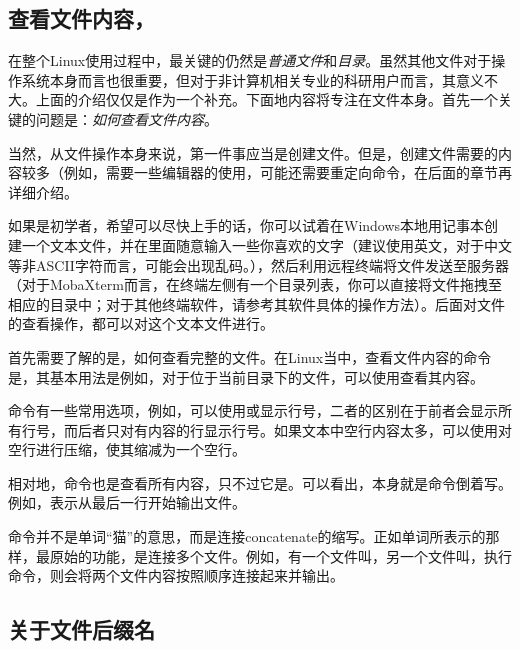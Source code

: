 \subsection{查看文件内容，}\label{subsec:查看文件-查看文件内容}

在整个Linux使用过程中，最关键的仍然是\emph{普通文件}和\emph{目录}。虽然其他文件对于操作系统本身而言也很重要，但对于非计算机相关专业的科研用户而言，其意义不大。上面的介绍仅仅是作为一个补充。下面地内容将专注在文件本身。首先一个关键的问题是：\emph{如何查看文件内容}。

\begin{attention}
    当然，从文件操作本身来说，第一件事应当是创建文件。但是，创建文件需要的内容较多（例如，需要一些编辑器的使用，可能还需要重定向命令，在后面的章节再详细介绍。
    
    如果是初学者，希望可以尽快上手的话，你可以试着在Windows本地用记事本创建一个文本文件，并在里面随意输入一些你喜欢的文字（建议使用英文，对于中文等非ASCII字符而言，可能会出现乱码。），然后利用远程终端将文件发送至服务器（对于MobaXterm而言，在终端左侧有一个目录列表，你可以直接将文件拖拽至相应的目录中；对于其他终端软件，请参考其软件具体的操作方法）。后面对文件的查看操作，都可以对这个文本文件进行。
\end{attention}

首先需要了解的是，如何查看完整的文件。在Linux当中，查看文件内容的命令是，其基本用法是例如，对于位于当前目录下的文件，可以使用查看其内容。

命令有一些常用选项，例如，可以使用或显示行号，二者的区别在于前者会显示所有行号，而后者只对有内容的行显示行号。如果文本中空行内容太多，可以使用对空行进行压缩，使其缩减为一个空行。

相对地，命令也是查看所有内容，只不过它是。可以看出，本身就是命令倒着写。例如，表示从最后一行开始输出文件。

\begin{attention}
    命令并不是单词“猫”的意思，而是连接concatenate的缩写。正如单词所表示的那样，最原始的功能，是连接多个文件。例如，有一个文件叫，另一个文件叫，执行命令，则会将两个文件内容按照顺序连接起来并输出。
\end{attention}

\subsection{关于文件后缀名}\label{subsec:查看文件-关于文件后缀名}

